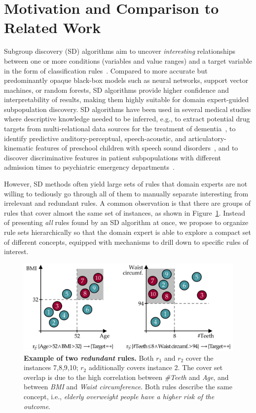 \documentclass[
  oneside]{book}
\begin{document}
\hypertarget{sdclu-intro}{%
\section{Motivation and Comparison to Related Work}\label{sdclu-intro}}

Subgroup discovery (SD) algorithms aim to uncover \emph{interesting} relationships between one or more conditions (variables and value ranges) and a target variable in the form of classification rules~\autocite{Herrera11,Atzmueller15}.
Compared to more accurate but predominantly opaque black-box models such as neural networks, support vector machines, or random forests, SD algorithms provide higher confidence and interpretability of results, making them highly suitable for domain expert-guided subpopulation discovery.
SD algorithms have been used in several medical studies where descriptive knowledge needed to be inferred, e.g., to extract potential drug targets from multi-relational data sources for the treatment of dementia~\autocite{Nguyen:Nature15}, to identify predictive auditory-perceptual, speech-acoustic, and articulatory-kinematic features of preschool children with speech sound disorders~\autocite{Vick14}, and to discover discriminative features in patient subpopulations with different admission times to psychiatric emergency departments~\autocite{Carmona11}.

However, SD methods often yield large sets of rules that domain experts are not willing to tediously go through all of them to manually separate interesting from irrelevant and redundant rules.
A common observation is that there are groups of rules that cover almost the same set of instances, as shown in Figure~\ref{fig:04-rule-redundancy}.
Instead of presenting \emph{all} rules found by an SD algorithm at once, we propose to organize rule sets hierarchically so that the domain expert is able to explore a compact set of different concepts, equipped with mechanisms to drill down to specific rules of interest.



\begin{figure}

{\centering \includegraphics[width=0.8\linewidth]{figures/04-rule-redundancy} 

}

\caption{\textbf{Example of two \emph{redundant} rules.} Both \(r_1\) and \(r_2\) cover the instances 7,8,9,10; \(r_2\) additionally covers instance 2. The cover set overlap is due to the high correlation between \emph{\#Teeth} and \emph{Age}, and between \emph{BMI} and \emph{Waist circumference}. Both rules describe the same concept, i.e., \emph{elderly overweight people have a higher risk of the outcome}.}\label{fig:04-rule-redundancy}
\end{figure}
\end{document}
